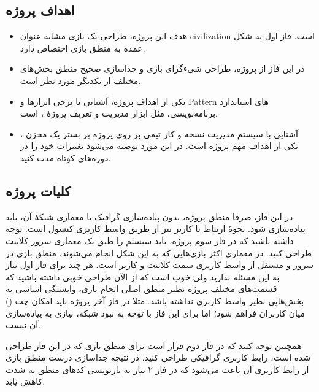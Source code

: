\documentclass[]{article}
\begin{document}
\subsection*{{\titr اهداف پروژه}}


\begin{itemize}

\item
هدف این پروژه، طراحی یک بازی مشابه عنوان civilization است. فاز اول به شکل عمده به منطق بازی اختصاص دارد. 

\item
در این فاز از پروژه، طراحی شی‌ءگرای بازی و جداسازی صحیح منطق بخش‌های مختلف از یکدیگر مورد نظر است.

\item
یکی از اهداف پروژه، آشنایی با برخی ابزارها و Pattern های استاندارد برنامه‌نویسی، مثل ابزار مدیریت و تعریف پروژه‌ٔ 
\href{https://en.wikipedia.org/wiki/Apache_Maven}{\textcolor{blue}{\underline{}}}، 
است.

\item
آشنایی با سیستم مدیریت نسخه  و کار تیمی بر روی پروژه بر بستر یک مخزن ، یکی از اهداف مهم پروژه است. در این مورد توصیه می‌شود تغییرات خود را در دوره‌های کوتاه مدت  کنید.

\end{itemize}

\subsection*{{\titr کلیات پروژه}}

در این فاز، صرفا منطق پروژه، بدون پیاده‌سازی گرافیک یا معماری شبکهٔ آن، باید پیاده‌سازی شود. نحوهٔ ارتباط با کاربر نیز از طریق واسط کاربری کنسول است. توجه داشته باشید که در فاز سوم پروژه، باید سیستم را طبق یک معماری سرور-کلاینت طراحی کنید. در معماری اکثر بازی‌هایی که به این شکل انجام می‌شوند، منطق بازی در سرور و مستقل از واسط کاربری سمت کلاینت و کاربر است. هر چند برای فاز اول نیاز به این مسئله ندارید ولی خوب‌ است که از الآن طراحی خوبی داشته باشید که قسمت‌های مختلف پروژه نظیر منطق اصلی انجام بازی، وابستگی اساسی به بخش‌هایی نظیر واسط کاربری نداشته باشد. مثلا در فاز‌ آخر پروژه باید امکان چت () میان کاربران فراهم 
شود؛ اما برای این فاز با توجه به نبود شبکه، نیازی به پیاده‌سازی آن نیست.

همچنین توجه کنید که در فاز دوم قرار است برای منطق بازی که در این فاز طراحی شده است، رابط کاربری گرافیکی طراحی کنید. در نتیجه جداسازی درست منطق بازی از رابط کاربری آن باعث می‌شود که در فاز ۲ نیاز به بازنویسی کدهای منطق به شدت کاهش یابد. 
\end{document}
